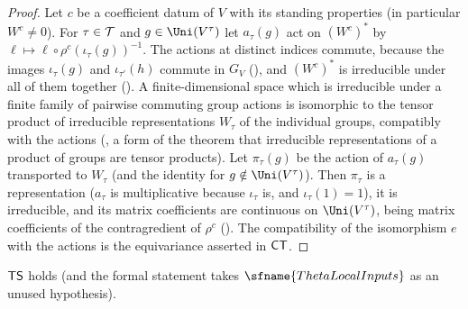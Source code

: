 \begin{proof}
Let $c$ be a coefficient datum of $V$ with its standing properties (in particular $W^c\ne0$). For $\tau\in\mathcal T$ and $g\in\Uni(V^\tau)$ let
$a_\tau(g)$ act on $(W^c)^*$ by $\ell\mapsto\ell\circ\rho^c(\iota_\tau(g))^{-1}$. The actions at distinct indices commute, because the
images $\iota_\tau(g)$ and $\iota_{\tau'}(h)$ commute in $G_V$ (), and $(W^c)^*$ is
irreducible under all of them together (). A finite-dimensional
space which is irreducible under a finite family of pairwise commuting group actions is isomorphic to the tensor product of irreducible
representations $W_\tau$ of the individual groups, compatibly with the actions
(, a form of the theorem that irreducible representations of a
product of groups are tensor products). Let $\pi_\tau(g)$ be the action of $a_\tau(g)$ transported to $W_\tau$ (and the identity for
$g\notin\Uni(V^\tau)$). Then $\pi_\tau$ is a representation ($a_\tau$ is multiplicative because $\iota_\tau$ is, and $\iota_\tau(1)=1$), it
is irreducible, and its matrix coefficients are continuous on $\Uni(V^\tau)$, being matrix coefficients of the contragredient of $\rho^c$
(). The compatibility of the isomorphism $e$ with the
actions is the equivariance asserted in $\mathsf{CT}$.
\end{proof}

\begin{proposition}\label{pf:fs:topSep}
$\mathsf{TS}$ holds (and the formal statement takes $\sfname{ThetaLocalInputs}$ as an unused hypothesis).
\end{proposition}

